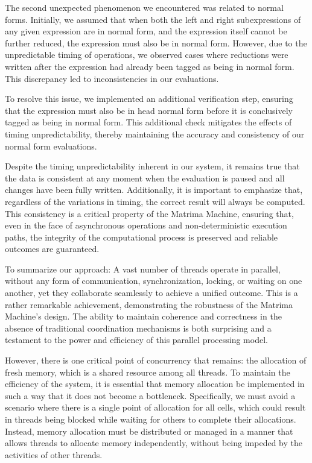 \documentclass{IEEEtran}
\begin{document}
\par The second unexpected phenomenon we encountered was related to normal forms. Initially, we assumed that when both the left and right subexpressions of any given expression are in normal form, and the expression itself cannot be further reduced, the expression must also be in normal form. However, due to the unpredictable timing of operations, we observed cases where reductions were written after the expression had already been tagged as being in normal form. This discrepancy led to inconsistencies in our evaluations.

\par To resolve this issue, we implemented an additional verification step, ensuring that the expression must also be in head normal form before it is conclusively tagged as being in normal form. This additional check mitigates the effects of timing unpredictability, thereby maintaining the accuracy and consistency of our normal form evaluations.

\par Despite the timing unpredictability inherent in our system, it remains true that the data is consistent at any moment when the evaluation is paused and all changes have been fully written. Additionally, it is important to emphasize that, regardless of the variations in timing, the correct result will always be computed. This consistency is a critical property of the Matrima Machine, ensuring that, even in the face of asynchronous operations and non-deterministic execution paths, the integrity of the computational process is preserved and reliable outcomes are guaranteed.

\par To summarize our approach: A vast number of threads operate in parallel, without any form of communication, synchronization, locking, or waiting on one another, yet they collaborate seamlessly to achieve a unified outcome. This is a rather remarkable achievement, demonstrating the robustness of the Matrima Machine's design. The ability to maintain coherence and correctness in the absence of traditional coordination mechanisms is both surprising and a testament to the power and efficiency of this parallel processing model.

\par However, there is one critical point of concurrency that remains: the allocation of fresh memory, which is a shared resource among all threads. To maintain the efficiency of the system, it is essential that memory allocation be implemented in such a way that it does not become a bottleneck. Specifically, we must avoid a scenario where there is a single point of allocation for all cells, which could result in threads being blocked while waiting for others to complete their allocations. Instead, memory allocation must be distributed or managed in a manner that allows threads to allocate memory independently, without being impeded by the activities of other threads.
\end{document}
